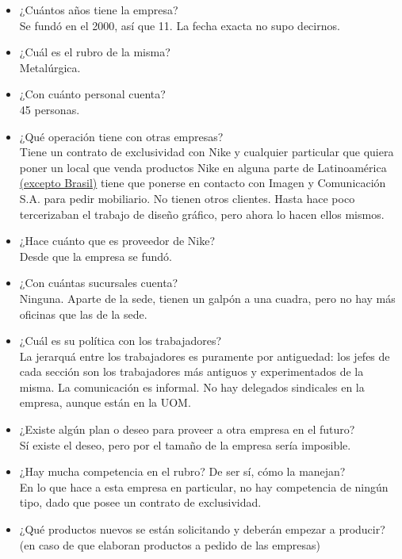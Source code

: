 \documentclass[a4paper,10pt,titlepage]{article}
\begin{document}
\begin{itemize}

\item ¿Cu\'antos a\~nos tiene la empresa? \\
Se fund\'o en el 2000, as\'i que 11. La fecha exacta no supo decirnos.
\item ¿Cu\'al es el rubro de la misma? \\
Metal\'urgica.
\item ¿Con cu\'anto personal cuenta? \\
45 personas.
\item ¿Qu\'e operaci\'on tiene con otras empresas? \\
Tiene un contrato de exclusividad con Nike y cualquier particular que quiera poner un local que venda productos Nike 
en alguna parte de Latinoam\'erica \underline{(excepto Brasil)} tiene que ponerse en contacto con Imagen y Comunicación S.A. 
para pedir mobiliario. No tienen otros clientes. Hasta hace poco tercerizaban el trabajo de diseño gr\'afico, pero ahora lo hacen ellos mismos.
\item ¿Hace cu\'anto que es proveedor de Nike? \\
Desde que la empresa se fund\'o.
\item ¿Con cu\'antas sucursales cuenta? \\
Ninguna. Aparte de la sede, tienen un galp\'on a una cuadra, pero no hay m\'as oficinas que las de la sede.
\item ¿Cu\'al es su pol\'itica con los trabajadores? \\
La jerarqu\'a entre los trabajadores es puramente por antiguedad: los jefes de cada secci\'on son los trabajadores m\'as antiguos
 y experimentados de la misma. La comunicaci\'on es informal. No hay delegados sindicales en la empresa, aunque est\'an en la UOM.
\item ¿Existe alg\'un plan o deseo para proveer a otra empresa en el futuro? \\
S\'i existe el deseo, pero por el tamaño de la empresa ser\'ia imposible.
\item ¿Hay mucha competencia en el rubro? De ser s\'i, c\'omo la manejan? \\
En lo que hace a esta empresa en particular, no hay competencia de ning\'un tipo, dado que posee un contrato de exclusividad.
\item ¿Qu\'e productos nuevos se est\'an solicitando y deber\'an empezar a producir? (en caso de que elaboran productos a pedido de las empresas) \\

\end{itemize}
\end{document}
